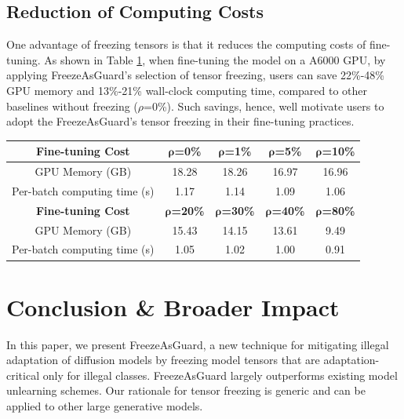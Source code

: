 \documentclass{article}
\begin{document}
\vspace{-0.05in}
\subsection{Reduction of Computing Costs}
One advantage of freezing tensors is that it reduces the computing costs of fine-tuning.
As shown in Table \ref{tab:fine-tuning_cost}, when fine-tuning the model on a A6000 GPU, by applying FreezeAsGuard's selection of tensor freezing, users can save 22\%-48\% GPU memory and 13\%-21\% wall-clock computing time, compared to other baselines without freezing ($\rho$=0\%). Such savings, hence, well motivate users to adopt the FreezeAsGuard's tensor freezing in their fine-tuning practices.
\begin{table}[ht]
	\centering
	\vspace{-0.05in}
	{\fontsize{9}{9}\selectfont
		\begin{tabular}{ccccc}
			\toprule
			\textbf{Fine-tuning Cost} & $\boldsymbol{\rho}$\textbf{=0\%} & $\boldsymbol{\rho}$\textbf{=1\%} & $\boldsymbol{\rho}$\textbf{=5\%} & $\boldsymbol{\rho}$\textbf{=10\%}  \\
			\midrule
			GPU Memory (GB) & 18.28 & 18.26 & 16.97 & 16.96 \\
			Per-batch computing time (s) & 1.17 & 1.14 & 1.09 & 1.06 \\
			\midrule[1pt]
               \textbf{Fine-tuning Cost} & $\boldsymbol{\rho}$\textbf{=20\%} & $\boldsymbol{\rho}$\textbf{=30\%} & $\boldsymbol{\rho}$\textbf{=40\%} & $\boldsymbol{\rho}$\textbf{=80\%} \\
               \midrule
               GPU Memory (GB)  & 15.43 & 14.15 & 13.61 & 9.49 \\
		    Per-batch computing time (s)  & 1.05 & 1.02 & 1.00 & 0.91 \\
                \bottomrule
	\end{tabular}}
\vspace{0.1in}
	\label{tab:fine-tuning_cost}
\end{table}






\vspace{-0.05in}
\section{Conclusion \& Broader Impact}
\vspace{-0.05in}
In this paper, we present FreezeAsGuard, a new technique for mitigating illegal adaptation of diffusion models by freezing model tensors that are adaptation-critical only for illegal classes. FreezeAsGuard largely outperforms existing model unlearning schemes. Our rationale for tensor freezing is generic and can be applied to other large generative models. 
\end{document}
